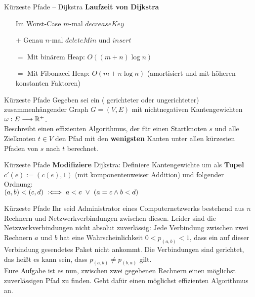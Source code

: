 \begin{frame}{Kürzeste Pfade – Dijkstra}
	\textbf{Laufzeit von Dijkstra} 
	\begin{itemize}
		\item[] Im Worst-Case $m$-mal $decreaseKey$
		\item[$+$] Genau $n$-mal $deleteMin$ und $insert$
		\pause
		\item[$=$] Mit binärem Heap: $O\left((m+n)\log n\right)$
		\pause
		\item[$=$] Mit Fibonacci-Heap: $O(m + n \log n)$ \quad (amortisiert und mit höheren konstanten Faktoren)
	\end{itemize}
\end{frame}

\begin{frame}{Kürzeste Pfade}
	Gegeben sei ein ( gerichteter oder ungerichteter) zusammenhängender Graph $G = (V, E)$ mit nichtnegativen Kantengewichten $\omega : E \longrightarrow \mathbb{R}^{+}$. \\
	\smallskip
	 Beschreibt einen effizienten Algorithmus, der für einen Startknoten $s$ und alle Zielknoten $t \in V$ den Pfad mit den \textbf{wenigsten} Kanten unter allen kürzesten Pfaden von $s$ nach $t$ berechnet.
\end{frame}

\begin{frame}{Kürzeste Pfade}
	\solutionheading
	\textbf{Modifiziere} Dijkstra: Definiere Kantengewichte um als \textbf{Tupel} $c'(e) := \left(c(e), 1\right)$ (mit komponentenweiser Addition) und folgender Ordnung: \\ $(a, b) < (c, d) \Gdwdef a < c \ \lor\  (a = c \land b < d)$ 
\end{frame}

\begin{frame}{Kürzeste Pfade}
	Ihr seid Administrator eines Computernetzwerks bestehend aus $n$ Rechnern und Netzwerkverbindungen
	zwischen diesen. Leider sind die Netzwerkverbindungen nicht absolut zuverlässig: Jede Verbindung
	zwischen zwei Rechnern $a$ und $b$ hat eine Wahrscheinlichkeit $0 < p_{(a,b)} < 1$, dass ein auf dieser
	Verbindung gesendetes Paket nicht ankommt. Die Verbindungen sind gerichtet, das heißt es kann sein,
	dass $p_{(a,b)} \neq p_{(b,a)}$ gilt. \\
	\medskip
	Eure Aufgabe ist es nun, zwischen zwei gegebenen Rechnern einen möglichst zuverlässigen Pfad zu finden.
	Gebt dafür einen möglichst effizienten Algorithmus an.
\end{frame}

